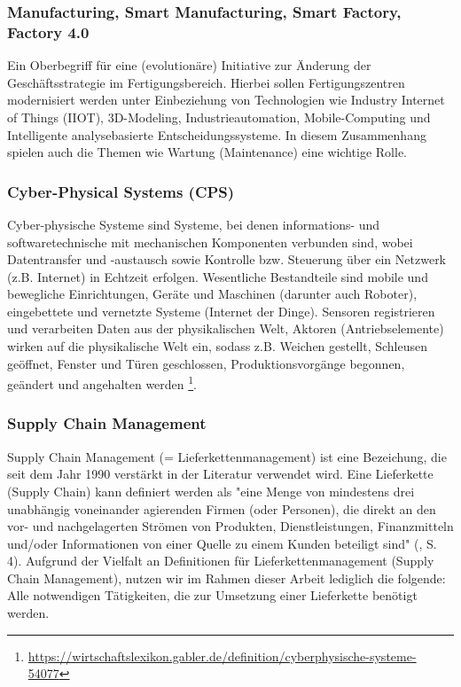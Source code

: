 \documentclass{article}
\begin{document}
\subsubsection{Manufacturing, Smart Manufacturing, Smart Factory, Factory 4.0}

Ein Oberbegriff für eine (evolutionäre) Initiative zur Änderung der Geschäftsstrategie im Fertigungsbereich.
Hierbei sollen Fertigungszentren modernisiert werden unter Einbeziehung von Technologien wie Industry Internet of Things (IIOT), 3D-Modeling, Industrieautomation, Mobile-Computing und Intelligente analysebasierte Entscheidungssysteme.
In diesem Zusammenhang spielen auch die Themen wie Wartung (Maintenance) eine wichtige Rolle.

\subsubsection{Cyber-Physical Systems (CPS)}

Cyber-physische Systeme sind Systeme, bei denen informations- und softwaretechnische mit mechanischen Komponenten verbunden sind, wobei Datentransfer und -austausch sowie Kontrolle bzw. Steuerung über ein Netzwerk (z.B. Internet) in Echtzeit erfolgen.
Wesentliche Bestandteile sind mobile und bewegliche Einrichtungen, Geräte und Maschinen (darunter auch Roboter), eingebettete und vernetzte Systeme (Internet der Dinge).
Sensoren registrieren und verarbeiten Daten aus der physikalischen Welt, Aktoren (Antriebselemente) wirken auf die physikalische Welt ein, sodass z.B. Weichen gestellt, Schleusen geöffnet, Fenster und Türen geschlossen, Produktionsvorgänge begonnen, geändert und angehalten werden \footnote{\url{https://wirtschaftslexikon.gabler.de/definition/cyberphysische-systeme-54077}}.

\subsubsection{Supply Chain Management}

Supply Chain Management (= Lieferkettenmanagement) ist eine Bezeichung, die seit dem Jahr 1990 verstärkt in der Literatur verwendet wird. Eine Lieferkette (Supply Chain) kann definiert werden als "eine Menge von mindestens drei unabhängig voneinander agierenden Firmen (oder Personen), die direkt an den vor- und nachgelagerten Strömen von Produkten, Dienstleistungen, Finanzmitteln und/oder Informationen von einer Quelle zu einem Kunden beteiligt sind" (\cite{mentzer2001defining}, S. 4). Aufgrund der Vielfalt an Definitionen für Lieferkettenmanagement (Supply Chain Management), nutzen wir im Rahmen dieser Arbeit lediglich die folgende: Alle notwendigen Tätigkeiten, die zur Umsetzung einer Lieferkette benötigt werden.
\end{document}
